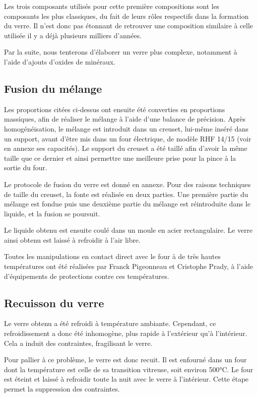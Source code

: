 \documentclass{article}
\begin{document}
Les trois composants utilisés pour cette première compositions sont les composants les plus classiques, du fait de leurs rôles respectifs dans la formation du verre. Il n'est donc pas étonnant de retrouver une composition similaire à celle utilisée il y a déjà plusieurs milliers d'années. 

Par la suite, nous tenterons d'élaborer un verre plus complexe, notamment à l'aide d'ajouts d'oxides de minéraux.

\subsection{Fusion du mélange}

Les proportions citées ci-dessus ont ensuite été converties en proportions massiques, afin de réaliser le mélange à l'aide d'une balance de précision. Après homogénéisation, le mélange est introduit dans un creuset, lui-même inséré dans un support, avant d'être mis dans un four électrique, de modèle RHF 14/15 (voir en annexe ses capacités). Le support du creuset a été taillé afin d'avoir la même taille que ce dernier et ainsi permettre une meilleure prise pour la pince à la sortie du four.

Le protocole de fusion du verre est donné en annexe. Pour des raisons techniques de taille du creuset, la fonte est réalisée en deux parties. Une première partie du mélange est fondue puis une deuxième partie du mélange est réintroduite dans le liquide, et la fusion se poursuit.

Le liquide obtenu est ensuite coulé dans un moule en acier rectangulaire. Le verre ainsi obtenu est laissé à refroidir à l'air libre.

Toutes les manipulations en contact direct avec le four à de très hautes températures ont été réalisées par Franck Pigeonneau et Cristophe Prady, à l'aide d'équipements de protections contre ces températures.

\subsection{Recuisson du verre}

Le verre obtenu a été refroidi à température ambiante. Cependant, ce refroidissement a donc été inhomogène, plus rapide à l'extérieur qu'à l'intérieur. Cela a induit des contraintes, fragilisant le verre.

Pour pallier à ce problème, le verre est donc recuit. Il est enfourné dans un four dont la température est celle de sa transition vitreuse, soit environ 500°C. Le four est éteint et laissé à refroidir toute la nuit avec le verre à l'intérieur.
Cette étape permet la suppression des contraintes.
\end{document}
